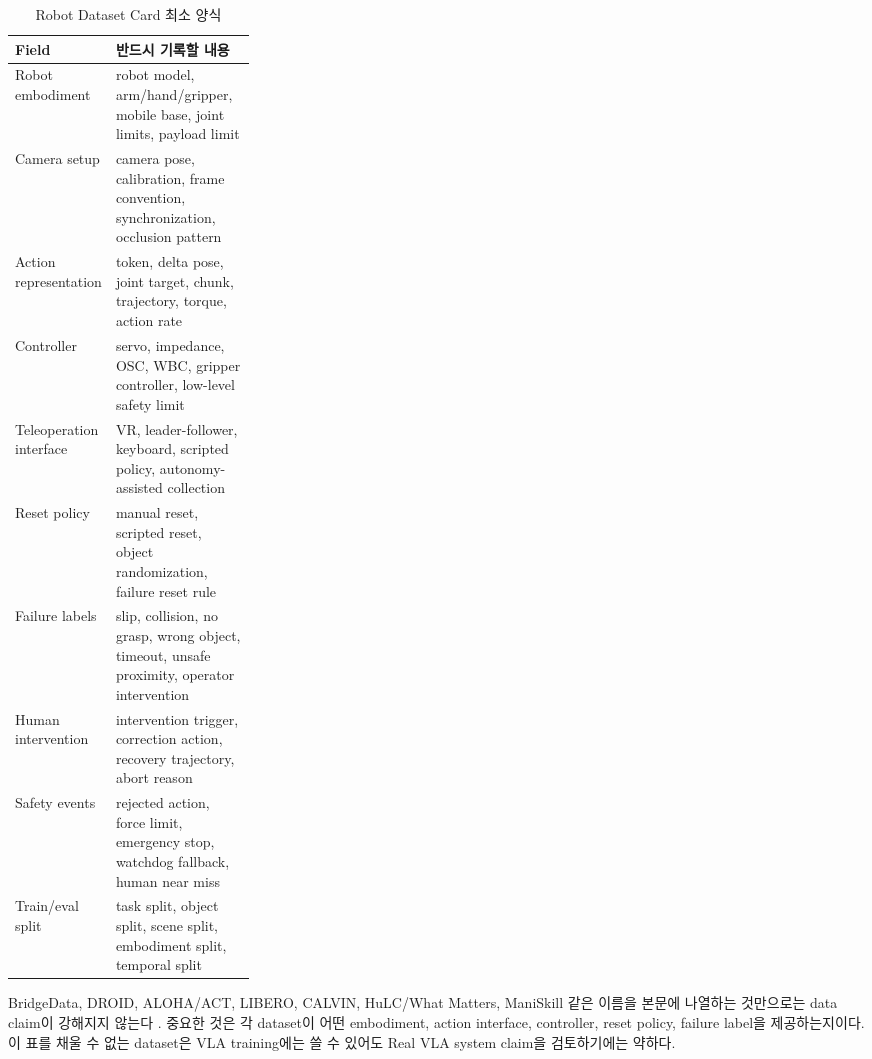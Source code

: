 \begin{table}[h]
  \centering
  \small
  \caption{Robot Dataset Card 최소 양식}
  \begin{tabularx}{\linewidth}{@{}p{0.28\linewidth}X@{}}
    \toprule
    Field & 반드시 기록할 내용 \\
    \midrule
    Robot embodiment & robot model, arm/hand/gripper, mobile base, joint limits, payload limit \\
    Camera setup & camera pose, calibration, frame convention, synchronization, occlusion pattern \\
    Action representation & token, delta pose, joint target, chunk, trajectory, torque, action rate \\
    Controller & servo, impedance, OSC, WBC, gripper controller, low-level safety limit \\
    Teleoperation interface & VR, leader-follower, keyboard, scripted policy, autonomy-assisted collection \\
    Reset policy & manual reset, scripted reset, object randomization, failure reset rule \\
    Failure labels & slip, collision, no grasp, wrong object, timeout, unsafe proximity, operator intervention \\
    Human intervention & intervention trigger, correction action, recovery trajectory, abort reason \\
    Safety events & rejected action, force limit, emergency stop, watchdog fallback, human near miss \\
    Train/eval split & task split, object split, scene split, embodiment split, temporal split \\
    \bottomrule
  \end{tabularx}
  \label{tab:ch14-dataset-card}
\end{table}

BridgeData, DROID, ALOHA/ACT, LIBERO, CALVIN, HuLC/What Matters, ManiSkill 같은 이름을 본문에 나열하는 것만으로는 data claim이 강해지지 않는다 \cite{bridgedatav22023,droid2024,act2023,libero2023,calvin2022,hulc2022,maniskill22023}. 중요한 것은 각 dataset이 어떤 embodiment, action interface, controller, reset policy, failure label을 제공하는지이다. 이 표를 채울 수 없는 dataset은 VLA training에는 쓸 수 있어도 Real VLA system claim을 검토하기에는 약하다.

